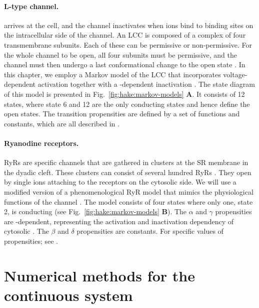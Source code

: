 \paragraph{L-type \Ca channel.}
\label{sec:hake:lcc}

arrives at the cell, and the channel inactivates when \Ca ions bind to
binding sites on the intracellular side of the channel. An LCC is
composed of a complex of four transmembrane subunits. Each of these
can be permissive or non-permissive. For the whole channel to be open,
all four subunits must be permissive, and the channel must then
undergo a last conformational change to the open state
\citep{Hille2001}. In this chapter, we employ a Markov model of the LCC
that incorporates voltage-dependent activation together with a
\Ca-dependent inactivation
\citep{JafriRiceWinslow1998,GreensteinWinslow2002}. The state diagram
of this model is presented in Fig.~\ref{fig:hake:markov-models}
\textbf{A}. It consists of 12 states, where state 6 and 12 are the
only conducting states and hence define the open states. The
transition propensities are defined by a set of functions and
constants, which are all described in \citet{GreensteinWinslow2002}.

\paragraph{Ryanodine receptors.}
\label{sec:hake:ryr}

RyRs are \Ca specific channels that are gathered in clusters at the SR
membrane in the dyadic cleft. These clusters can consist of several
hundred RyRs
\citep{BeuckelmannWier1988,Franzini-ArmstrongProtasiRamesh1999}. They
open by single \Ca ions attaching to the receptors on the cytosolic
side. We will use a modified version of a phenomenological RyR model
that mimics the physiological functions of the channel
\citep{SternSongEtAl1999}. The model consists of four states where only
one, state 2, is conducting (see Fig.~\ref{fig:hake:markov-models}
\textbf{B}). The $\alpha$ and $\gamma$ propensities are \Ca-dependent,
representing the activation and inactivation dependency of cytosolic
\CaC. The $\beta$ and $\delta$ propensities are constants. For
specific values of propensities; see \citet{SternSongEtAl1999}.

\section{Numerical methods for the continuous system}

